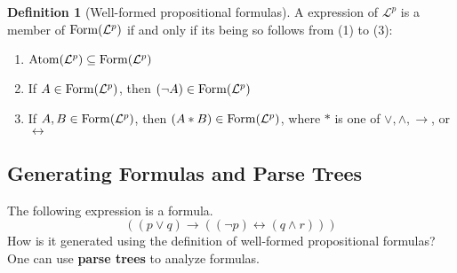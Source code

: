 \documentclass[11pt]{article}
\theoremstyle{definition}
\newtheorem{defn}[thm]{Definition}
\begin{document}
\begin{defn}[Well-formed propositional formulas]
A expression of $\mathcal{L}^p$ is a member of ${\rm Form}(\mathcal{L}^p)$ if and only if its being so follows from (1) to (3): \vspace{-0.25cm}
\begin{enumerate}[(1)]
\item ${\rm Atom}(\mathcal{L}^p) \subseteq {\rm Form}(\mathcal{L}^p)$
\item If $A \in {\rm Form}(\mathcal{L}^p)$, then $(\neg A) \in {\rm Form}(\mathcal{L}^p)$
\item If $A, B \in {\rm Form}(\mathcal{L}^p)$, then $(A * B) \in {\rm Form}(\mathcal{L}^p)$, where $*$ is one of $\vee, \wedge, \rightarrow$, or $\leftrightarrow$
\end{enumerate}
\end{defn}

\subsection{Generating Formulas and Parse Trees}
The following expression is a formula.
$$((p \vee q) \rightarrow ((\neg p) \leftrightarrow (q \wedge r)))$$
How is it generated using the definition of well-formed propositional
formulas? One can use {\bf parse trees} to analyze formulas.
\end{document}
